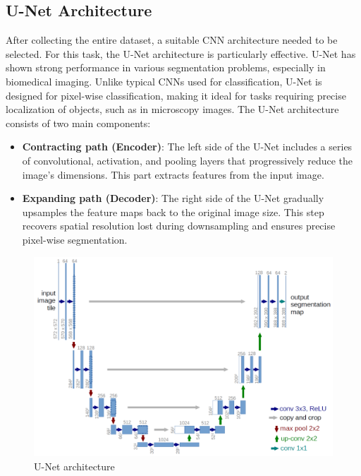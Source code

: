 \subsection{U-Net Architecture}

After collecting the entire dataset, a suitable CNN architecture needed to be selected. For this task, the U-Net architecture\cite{ronneberger2015unetconvolutionalnetworksbiomedical} is particularly effective. U-Net has shown strong performance in various segmentation problems, especially in biomedical imaging. Unlike typical CNNs used for classification, U-Net is designed for pixel-wise classification, making it ideal for tasks requiring precise localization of objects, such as in microscopy images. The U-Net architecture consists of two main components:

\begin{itemize}
    \item \textbf{Contracting path (Encoder)}: The left side of the U-Net includes a series of convolutional, activation, and pooling layers that progressively reduce the image's dimensions. This part extracts features from the input image.
    
    \item \textbf{Expanding path (Decoder)}: The right side of the U-Net gradually upsamples the feature maps back to the original image size. This step recovers spatial resolution lost during downsampling and ensures precise pixel-wise segmentation.
\end{itemize}

\begin{figure}[H]
    \centering
    \includegraphics[width=0.8\linewidth]{PICTURES/unet-architecture.png}
    \caption{U-Net architecture \cite{ronneberger_u-net_2015}}
    \label{fig:unet-architecture}
\end{figure}


